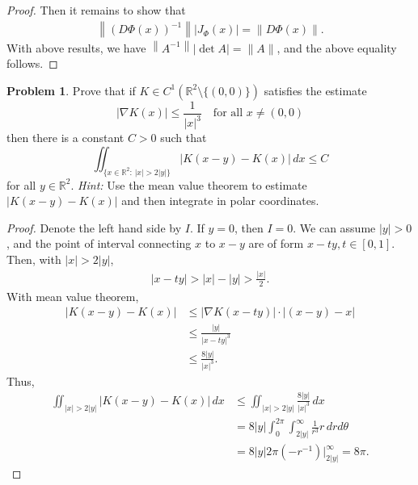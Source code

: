 \documentclass[11pt]{article}
\theoremstyle{definition}
\newtheorem{problem}{Problem}
\theoremstyle{definition}
\begin{document}
\begin{proof}
Then it remains to show that 
\begin{align*}
    \left\|\left(D\Phi(x)\right)^{-1} \right\| \left|J_\Phi(x)\right| = \left\|D\Phi(x) \right\|.
\end{align*}
With above results, we have $\left\|A^{-1}\right\| |\det A|= \|A\|$, and the above equality follows.
\end{proof}

\medskip

\begin{problem}
Prove that if $K\in C^1(\mathbb{R}^2\setminus
\{ (0,0)\})$ satisfies the estimate
$$
\left|\nabla K(x)\right|\leq \frac{1}{|x|^3} \quad \mbox{for all $x \neq (0,0)$}
$$
then there is a constant $C>0$ such that
$$
\iint_{\{x\in\mathbb{R}^2:\, |x|>2|y|\}} \left|K(x-y)-K(x)\right|\, dx\leq C
$$
for all $y\in\mathbb{R}^2$. {\em Hint:} Use the mean value theorem to estimate $|K(x-y)-K(x)|$ and then integrate in polar coordinates.
\end{problem}
\begin{proof}
Denote the left hand side by $I$. If $y = 0$, then $I = 0$. We can assume $|y| > 0$, and the point of interval connecting $x$ to $x - y$ are of form $x - ty, t \in [0,1]$. Then, with $|x| > 2|y|$,
\begin{align*}
    |x - ty| > |x| - |y| > \frac{|x|}{2}.
\end{align*}
With mean value theorem, 
\begin{align*}
    |K(x-y) - K(x)| & \leq |\nabla K(x-ty)| \cdot |(x - y) - x| \\
    & \leq \frac{|y|}{|x-ty|^3} \\
    & \leq \frac{8|y|}{|x|^3}.
\end{align*}
Thus,
\begin{align*}
    \iint_{|x|>2|y|} |K(x-y)-K(x)|\, dx & \leq \iint_{|x|>2|y|} \frac{8|y|}{|x|^3}\, dx \\
    & = 8|y| \int^{2\pi}_0 \int^\infty_{2|y|} \frac{1}{r^3}r\, dr d\theta \\
    & = 8|y| 2\pi \left(- r^{-1}\right)\Big|_{2|y|}^\infty = 8 \pi.
\end{align*}
\end{proof}


\medskip
\end{document}
